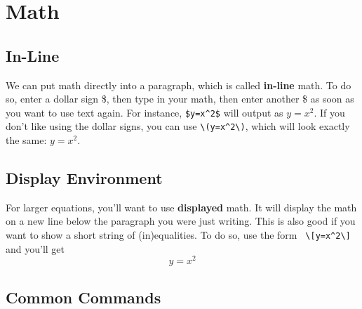 \documentclass[12pt]{article}
\begin{document}
\section{Math}

\subsection{In-Line}

We can put math directly into a paragraph, which is called \textbf{in-line}
math. To do so, enter a dollar sign \$, then type in your math, then enter
another \$ as soon as you want to use text again. For instance, \verb|$y=x^2$|
will output as $y=x^2$. If you don't like using the dollar signs, you can use
\verb|\(y=x^2\)|, which will look exactly the same: \(y=x^2\).


\subsection{Display Environment}

For larger equations, you'll want to use \textbf{displayed} math. It will
display the math on a new line below the paragraph you were just writing. This
is also good if you want to show a short string of (in)equalities. To do so, use
the form \verb| \[y=x^2\]| and you'll get
		\[y=x^2\]


\subsection{Common Commands}
\end{document}
